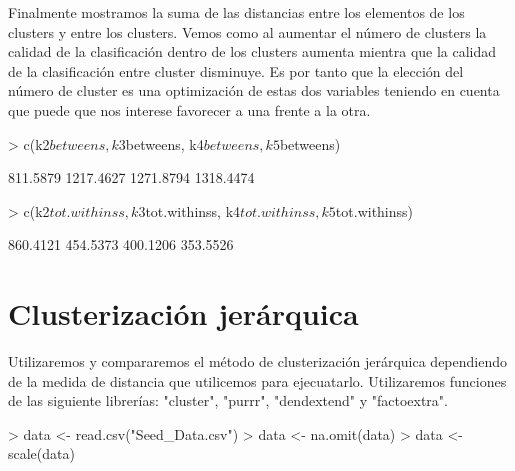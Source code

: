\documentclass [a4paper] {article}
\begin{document}
Finalmente mostramos la suma de las distancias entre los elementos de los clusters y entre los clusters.
Vemos como al aumentar el número de clusters la calidad de la clasificación dentro de los clusters aumenta mientra que la calidad de la clasificación entre cluster disminuye.
Es por tanto que la elección del número de cluster es una optimización de estas dos variables teniendo en cuenta que puede que nos interese favorecer a una frente a la otra.
\begin{Schunk}
\begin{Sinput}
> c(k2$betweens, k3$betweens, k4$betweens, k5$betweens)
\end{Sinput}
\begin{Soutput}
[1]  811.5879 1217.4627 1271.8794 1318.4474
\end{Soutput}
\begin{Sinput}
> c(k2$tot.withinss, k3$tot.withinss, k4$tot.withinss, k5$tot.withinss)
\end{Sinput}
\begin{Soutput}
[1] 860.4121 454.5373 400.1206 353.5526
\end{Soutput}
\end{Schunk}

\newpage
\section{Clusterización jerárquica}
Utilizaremos y compararemos el método de clusterización jerárquica dependiendo de la medida de distancia que utilicemos para ejecuatarlo.
Utilizaremos funciones de las siguiente librerías: "cluster", "purrr", "dendextend" y "factoextra".

\begin{Schunk}
\begin{Sinput}
> data <- read.csv("Seed_Data.csv")
> data <- na.omit(data)
> data <- scale(data)
\end{Sinput}
\end{Schunk}
\end{document}
